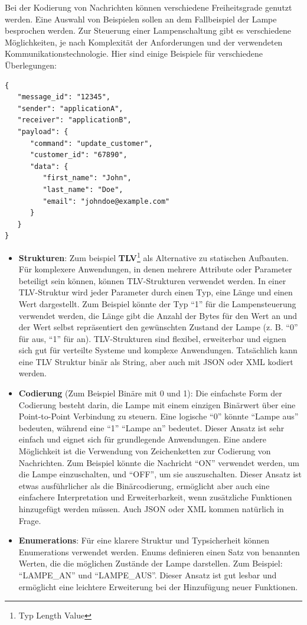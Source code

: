 \documentclass[../vs-script-first-v01.tex]{subfiles}
\begin{document}
\begin{itemize}
Bei der Kodierung von Nachrichten können verschiedene Freiheitsgrade genutzt werden. Eine Auswahl von Beispielen sollen an dem Fallbeispiel der Lampe besprochen werden. Zur Steuerung einer Lampenschaltung gibt es verschiedene Möglichkeiten, je nach Komplexität der Anforderungen und der verwendeten Kommunikationstechnologie. Hier sind einige Beispiele für verschiedene Überlegungen:

\begin{lstlisting}[caption={Message für Point to Point Kommunikation},captionpos=b,label={lst:p2p-message}]
{
   "message_id": "12345",
   "sender": "applicationA",
   "receiver": "applicationB",
   "payload": {
      "command": "update_customer",
      "customer_id": "67890",
      "data": {
         "first_name": "John",
         "last_name": "Doe",
         "email": "johndoe@example.com"
      }
   }
}
\end{lstlisting}

\begin{itemize}
\item \textbf{Strukturen}: Zum beispiel \textbf{TLV}\footnote{Typ Length Value} als Alternative zu statischen Aufbauten. Für komplexere Anwendungen, in denen mehrere Attribute oder Parameter beteiligt sein können, können TLV-Strukturen verwendet werden. In einer TLV-Struktur wird jeder Parameter durch einen Typ, eine Länge und einen Wert dargestellt. Zum Beispiel könnte der Typ \enquote{1} für die Lampensteuerung verwendet werden, die Länge gibt die Anzahl der Bytes für den Wert an und der Wert selbst repräsentiert den gewünschten Zustand der Lampe (z. B. \enquote{0} für aus, \enquote{1} für an). TLV-Strukturen sind flexibel, erweiterbar und eignen sich gut für verteilte Systeme und komplexe Anwendungen. Tatsächlich kann eine TLV Struktur binär als String, aber auch mit JSON oder XML kodiert werden.
\item \textbf{Codierung} (Zum Beispiel Binäre mit 0 und 1): Die einfachste Form der Codierung besteht darin, die Lampe mit einem einzigen Binärwert über eine Point-to-Point Verbindung zu steuern. Eine logische \enquote{0} könnte \enquote{Lampe aus} bedeuten, während eine \enquote{1} \enquote{Lampe an} bedeutet. Dieser Ansatz ist sehr einfach und eignet sich für grundlegende Anwendungen. Eine andere Möglichkeit ist die Verwendung von Zeichenketten zur Codierung von Nachrichten. Zum Beispiel könnte die Nachricht \enquote{ON} verwendet werden, um die Lampe einzuschalten, und \enquote{OFF}, um sie auszuschalten. Dieser Ansatz ist etwas ausführlicher als die Binärcodierung, ermöglicht aber auch eine einfachere Interpretation und Erweiterbarkeit, wenn zusätzliche Funktionen hinzugefügt werden müssen. Auch JSON oder XML kommen natürlich in Frage.
\item \textbf{Enumerations}: Für eine klarere Struktur und Typsicherheit können Enumerations verwendet werden. Enums definieren einen Satz von benannten Werten, die die möglichen Zustände der Lampe darstellen. Zum Beispiel: \enquote{LAMPE\_AN} und \enquote{LAMPE\_AUS}. Dieser Ansatz ist gut lesbar und ermöglicht eine leichtere Erweiterung bei der Hinzufügung neuer Funktionen.
\end{itemize}


\end{itemize}
\end{document}
